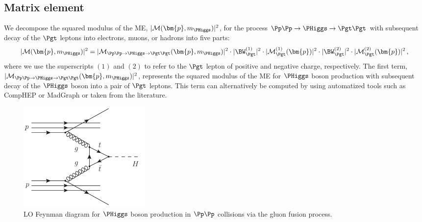 \subsection{Matrix element}
\label{sec:mem_ME}

We decompose the squared modulus of the ME, $\vert \mathcal{M}(\bm{p},m_{\PHiggs}) \vert^{2}$, for the process $\Pp\Pp \to \PHiggs \to \Pgt\Pgt$
with subsequent decay of the $\Pgt$ leptons into electrons, muons, or
hadrons into five parts:
\begin{equation}
\vert \mathcal{M}(\bm{p},m_{\PHiggs}) \vert^{2} = 
 \vert \mathcal{M}_{\Pp\Pp \to \PHiggs \to
   \Pgt\Pgt}(\bm{p},m_{\PHiggs}) \vert^{2} 
\cdot \vert \BW_{\Pgt}^{(1)} \vert^{2} 
\cdot \vert \mathcal{M}^{(1)}_{\Pgt}(\bm{p}) \vert^{2} 
\cdot \vert \BW_{\Pgt}^{(2)} \vert^{2} 
\cdot \vert \mathcal{M}^{(2)}_{\Pgt}(\bm{p}) \vert^{2}  \, ,
 \label{eq:meFactorization}
\end{equation}
where we use the superscripts $(1)$ and $(2)$ to refer to the $\Pgt$ lepton of positive and negative charge, respectively.
The first term, $\vert \mathcal{M}_{\Pp\Pp \to \PHiggs \to
  \Pgt\Pgt}(\bm{p},m_{\PHiggs}) \vert^{2}$, represents the squared
modulus of the ME for $\PHiggs$ boson production with subsequent decay of the $\PHiggs$ boson into a pair of $\Pgt$ leptons.
This term can alternatively be computed by using automatized tools such as CompHEP or MadGraph or taken from the literature.

\begin{figure}
\begin{center}
\includegraphics*[height=54mm]{figures/ggH_FeynmanDiagram.pdf}
\end{center}
\caption{
  LO Feynman diagram for $\PHiggs$ boson production in $\Pp\Pp$ collisions via the gluon fusion process.
}
\label{fig:ggH_FeynmanDiagram}
\end{figure}

